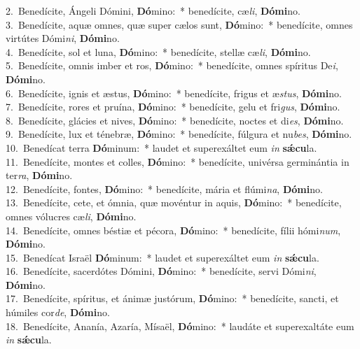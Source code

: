 {2.~}Benedícite, Ángeli Dómini, \textbf{Dó}mino:~* benedícite, cæ\textit{li}, \textbf{Dó}\textbf{mi}no.\\
{3.~}Benedícite, aquæ omnes, quæ super cælos sunt, \textbf{Dó}mino:~* benedícite, omnes virtútes Dómi\textit{ni}, \textbf{Dó}\textbf{mi}no.\\
{4.~}Benedícite, sol et luna, \textbf{Dó}mino:~* benedícite, stellæ cæ\textit{li}, \textbf{Dó}\textbf{mi}no.\\
{5.~}Benedícite, omnis imber et ros, \textbf{Dó}mino:~* benedícite, omnes spíritus De\textit{i}, \textbf{Dó}\textbf{mi}no.\\
{6.~}Benedícite, ignis et æstus, \textbf{Dó}mino:~* benedícite, frigus et æ\textit{stus}, \textbf{Dó}\textbf{mi}no.\\
{7.~}Benedícite, rores et pruína, \textbf{Dó}mino:~* benedícite, gelu et fri\textit{gus}, \textbf{Dó}\textbf{mi}no.\\
{8.~}Benedícite, glácies et nives, \textbf{Dó}mino:~* benedícite, noctes et di\textit{es}, \textbf{Dó}\textbf{mi}no.\\
{9.~}Benedícite, lux et ténebræ, \textbf{Dó}mino:~* benedícite, fúlgura et nu\textit{bes}, \textbf{Dó}\textbf{mi}no.\\
{10.~}Benedícat terra \textbf{Dó}minum:~* laudet et superexáltet eum \textit{in} \textbf{sǽ}\textbf{cu}la.\\
{11.~}Benedícite, montes et colles, \textbf{Dó}mino:~* benedícite, univérsa germinántia in ter\textit{ra}, \textbf{Dó}\textbf{mi}no.\\
{12.~}Benedícite, fontes, \textbf{Dó}mino:~* benedícite, mária et flúmi\textit{na}, \textbf{Dó}\textbf{mi}no.\\
{13.~}Benedícite, cete, et ómnia, quæ movéntur in aquis, \textbf{Dó}mino:~* benedícite, omnes vólucres cæ\textit{li}, \textbf{Dó}\textbf{mi}no.\\
{14.~}Benedícite, omnes béstiæ et pécora, \textbf{Dó}mino:~* benedícite, fílii hómi\textit{num}, \textbf{Dó}\textbf{mi}no.\\
{15.~}Benedícat Israël \textbf{Dó}minum:~* laudet et superexáltet eum \textit{in} \textbf{sǽ}\textbf{cu}la.\\
{16.~}Benedícite, sacerdótes Dómini, \textbf{Dó}mino:~* benedícite, servi Dómi\textit{ni}, \textbf{Dó}\textbf{mi}no.\\
{17.~}Benedícite, spíritus, et ánimæ justórum, \textbf{Dó}mino:~* benedícite, sancti, et húmiles cor\textit{de}, \textbf{Dó}\textbf{mi}no.\\
{18.~}Benedícite, Ananía, Azaría, Mísaël, \textbf{Dó}mino:~* laudáte et superexaltáte eum \textit{in} \textbf{sǽ}\textbf{cu}la.\\
